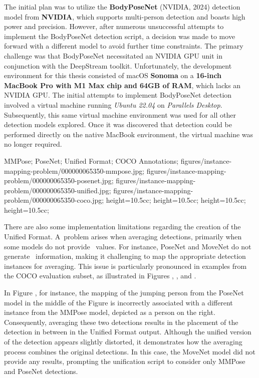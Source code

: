 The initial plan was to utilize the {\bf BodyPoseNet} (NVIDIA, 2024) detection model from {\bf NVIDIA}, which supports multi-person detection and boasts high power and precision. However, after numerous unsuccessful attempts to implement the BodyPoseNet detection script, a decision was made to move forward with a different model to avoid further time constraints. The primary challenge was that BodyPoseNet necessitated an NVIDIA GPU unit in conjunction with the DeepStream toolkit. Unfortunately, the development environment for this thesis consisted of macOS {\bf Sonoma} on a {\bf 16-inch MacBook Pro with M1 Max chip and 64GB of RAM}, which lacks an NVIDIA GPU. The initial attempts to implement BodyPoseNet detection involved a virtual machine running {\em Ubuntu 22.04} on {\em Parallels Desktop}. Subsequently, this same virtual machine environment was used for all other detection models explored. Once it was discovered that detection could be performed directly on the native MacBook environment, the virtual machine was no longer required.

 {
 MMPose;
 PoseNet;
 Unified Format;
 COCO Annotations;
 }
 {
 figures/instance-mapping-problem/000000065350-mmpose.jpg;
 figures/instance-mapping-problem/000000065350-posenet.jpg;
 figures/instance-mapping-problem/000000065350-unified.jpg;
 figures/instance-mapping-problem/000000065350-coco.jpg;
 }
 {
 height=10.5cc;
 height=10.5cc;
 height=10.5cc;
 height=10.5cc;
 }

There are also some implementation limitations regarding the creation of the Unified Format. A~problem arises when averaging detections, primarily when some models do not provide \BBOX\ values. For instance, PoseNet and MoveNet do not generate \BBOX\ information, making it challenging to map the appropriate detection instances for averaging. This issue is particularly pronounced in examples from the COCO evaluation subset, as illustrated in Figures , , and .

In Figure , for instance, the mapping of the jumping person from the PoseNet model in the middle of the Figure is incorrectly associated with a different instance from the MMPose model, depicted as a person on the right. Consequently, averaging these two detections results in the placement of the detection in between in the Unified Format output. Although the unified version of the detection appears slightly distorted, it demonstrates how the averaging process combines the original detections. In this case, the MoveNet model did not provide any results, prompting the unification script to consider only MMPose and PoseNet detections.

